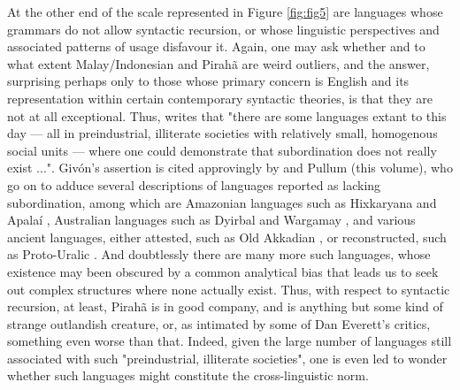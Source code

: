 \documentclass[output=paper,colorlinks,citecolor=brown
]{langscibook}
\begin{document}
At the other end of the scale represented in Figure \ref{fig:fig5} are languages whose grammars do not allow syntactic recursion, or whose linguistic perspectives and associated patterns of usage disfavour it.  Again, one may ask whether and to what extent Malay/Indonesian and Pirahã are weird outliers, and the answer, surprising perhaps only to those whose primary concern is English and its representation within certain contemporary syntactic theories, is that they are not at all exceptional.  Thus, \citet[298]{givon1979understanding} writes that "there are some languages extant to this day — all in preindustrial, illiterate societies with relatively small, homogenous social units — where one could demonstrate that subordination does not really exist ...".  Givón's assertion is cited approvingly by \citet{pullum2010recursion} and Pullum (this volume), who go on to adduce several descriptions of languages reported as lacking subordination, among which are Amazonian languages such as Hixkaryana 
\citep{derbyshire1979hixkaryana} and Apalaí \citep{koehn1986apalai}, Australian languages such as Dyirbal \citep{dixon1972dyirbal} and Wargamay \citep{dixon1981wargamay}, and various ancient languages, either attested, such as Old Akkadian \citep{deutscher2000syntactic}, or reconstructed, such as Proto-Uralic \citep{collinder1960comparative}.  And doubtlessly there are many more such languages, whose existence may been obscured by a common analytical bias that leads us to seek out complex structures where none actually exist.  Thus, with respect to syntactic recursion, at least, Pirahã is in good company, and is anything but some kind of strange outlandish creature, or, as intimated by some of Dan Everett's critics, something even worse than that.  Indeed, given the large number of languages still associated with such "preindustrial, illiterate societies", one is even led to wonder whether such languages might constitute the cross-linguistic norm.
\end{document}

